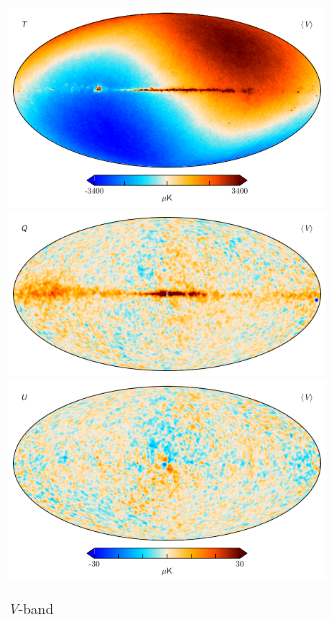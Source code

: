 \documentclass[twocolumn]{../../common/aa}
\newcommand{\V}[0]{\textit V}
\begin{document}
\begin{figure}
	\centering
	\includegraphics[width=0.75\textwidth]{figures/V_mu_I.pdf}
	\includegraphics[width=0.75\textwidth]{figures/V_mu_Q.pdf}
	\includegraphics[width=0.75\textwidth]{figures/V_mu_U.pdf}
	\caption{\V-band}
\end{figure}
\end{document}
